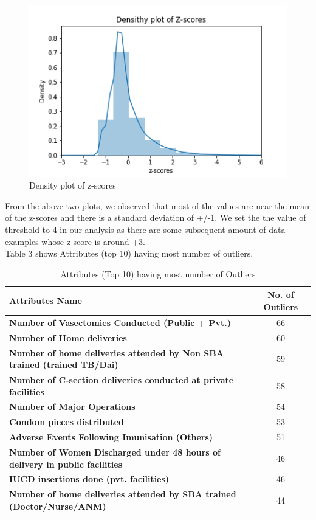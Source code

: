 \documentclass[12pt]{article}
\begin{document}
\pagebreak

\begin{figure}[h]
	\centering
	\includegraphics[scale=0.95]{images/zscore_density.png}
	\caption{Density plot of z-scores}
\end{figure}

\bigskip
From the above two plots, we observed that most of the values are near the mean of the z-scores and there is a standard deviation of +/-1. We set the the value of threshold to 4 in our analysis as there are some subsequent amount of data examples whose z-score is around +3.\\
Table 3 shows Attributes (top 10) having most number of outliers.

\begin{table}[h]
\caption{Attributes (Top 10) having most number of Outliers}
\hspace{-2cm}
\begin{tabular}{|l|c|}
\hline
\multicolumn{1}{|l|}{\textbf{Attributes Name}}                                      & \textbf{No. of Outliers} \\ \hline
\textbf{Number of Vasectomies Conducted (Public + Pvt.)} & 66 \\
\textbf{Number of Home deliveries}                       & 60 \\
\textbf{Number of home deliveries attended by Non SBA trained (trained TB/Dai)}     & 59                       \\
\textbf{Number of C-section deliveries conducted at private facilities}             & 58                       \\
\textbf{Number of Major Operations}                      & 54 \\
\textbf{Condom pieces distributed}                       & 53 \\
\textbf{Adverse Events Following Imunisation (Others)}   & 51 \\
\textbf{Number of Women Discharged under 48 hours of delivery in public facilities} & 46                       \\
\textbf{IUCD insertions done (pvt. facilities)}          & 46 \\
\textbf{Number of home deliveries attended by SBA trained (Doctor/Nurse/ANM)}       & 44                       \\ \hline
\end{tabular}
\end{table}
\end{document}
